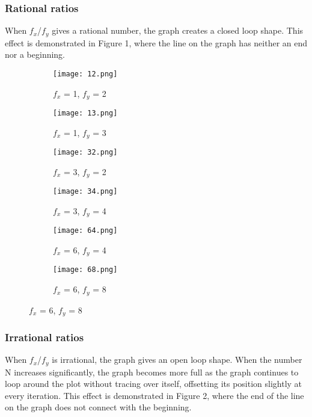 \documentclass{article}
\begin{document}
\subsubsection{Rational ratios}

When $f_x$/$f_y$ gives a rational number, the graph creates a closed loop shape. This effect is demonstrated in Figure 1, where the line on the graph has neither an end nor a beginning. 

\begin{figure}
    \caption{Rational $f_x$/$f_y$ values}
    \label{Rationals}


\begin{subfigure}{0.5\textwidth}
    \centering
    \texttt{[image: 12.png]}
    \caption{$f_x$ = 1, $f_y$ = 2}
    \label{12}
\end{subfigure}
\begin{subfigure}{0.5\textwidth}
    \centering
    \texttt{[image: 13.png]}
    \caption{$f_x$ = 1, $f_y$ = 3}
    \label{13}
\end{subfigure}
\begin{subfigure}{0.5\textwidth}
    \centering
    \texttt{[image: 32.png]}
    \caption{$f_x$ = 3, $f_y$ = 2}
    \label{32}
\end{subfigure}  
\begin{subfigure}{0.5\textwidth}
    \centering
    \texttt{[image: 34.png]}
    \caption{$f_x$ = 3, $f_y$ = 4}
    \label{34}
\end{subfigure}
\begin{subfigure}{0.5\textwidth}
    \centering
    \texttt{[image: 64.png]}
    \caption{$f_x$ = 6, $f_y$ = 4}
    \label{64}
\end{subfigure}  
\begin{subfigure}{0.5\textwidth}
    \centering
    \texttt{[image: 68.png]}
    \caption{$f_x$ = 6, $f_y$ = 8}
    \label{68}
\end{subfigure}

\end{figure}

\subsubsection{Irrational ratios}

When $f_x$/$f_y$ is irrational, the graph gives an open loop shape. When the number N increases significantly, the graph becomes more full as the graph continues to loop around the plot without tracing over itself, offsetting its position slightly at every iteration.  This effect is demonstrated in Figure 2, where the end of the line on the graph does not connect with the beginning. 
\end{document}
